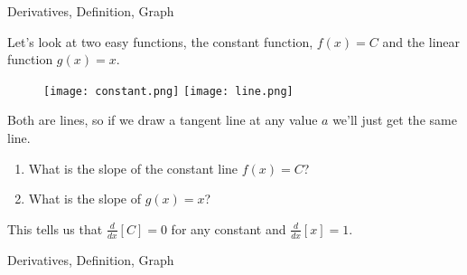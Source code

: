 
\begin{tagblock}{Derivatives, Definition, Graph}
\begin{question}
	

\bigskip







Let's look at two easy functions, the constant function, $f(x) = C$ and the linear function $g(x) =x$.  

\begin{figure}[h]
\centering
\texttt{[image: constant.png]} \hspace{.05in} \texttt{[image: line.png]}
\end{figure}
Both are lines, so if we draw a tangent line at any value $a$ we'll just get the same line. 
\begin{enumerate}
\item What is the slope of the constant line $f(x) = C$?  
\item What is the slope of $g(x) = x$?
\end{enumerate}

\bigskip


This tells us that $\frac{d}{dx}[C] = 0$ for any constant and $\frac{d}{dx}[x] = 1$.


	
	
\begin{tags}
	    Derivatives, Definition, Graph
\end{tags}
	
\begin{diary}
\end{diary}
	
\begin{solution}
	   
\end{solution}
	
\end{question}

\end{tagblock}


